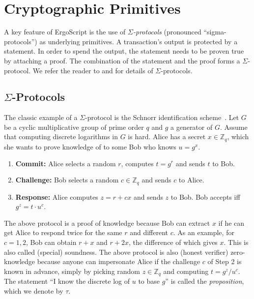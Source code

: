 \documentclass[11pt]{article}
\newcommand{\langname}{ErgoScript\xspace}
\begin{document}
\section{Cryptographic Primitives}
 
A key feature of \langname is the use of \emph{$\Sigma$-protocols} (pronounced ``sigma-protocols'') as underlying primitives. A transaction's output is protected by a statement. In order to spend the output, the statement needs to be proven true by attaching a proof. The combination of the statement and the proof forms a $\Sigma$-protocol. We refer the reader to \cite{Dam10} and \cite[Chapter 6]{HL10} for details of $\Sigma$-protocols. %

\subsection{$\Sigma$-Protocols}
\label{intro:sigma}

The classic example of a $\Sigma$-protocol is the Schnorr identification scheme~\cite{Sch91}. Let $G$ be a cyclic multiplicative group of prime order $q$ and $g$ a generator of $G$. Assume that computing discrete logarithms in $G$ is hard. Alice has a secret $x \in \mathbb{Z}_q$, which she wants to prove knowledge of to some Bob who knows $u = g^x$.

\begin{enumerate}
	\item \textbf{Commit:} Alice selects a random $r$, computes $t = g^r$ and sends $t$ to Bob.
	\item \textbf{Challenge:} Bob selects a random $c\in\mathbb{Z}_q$ and sends $c$ to Alice.
	\item \textbf{Response:} Alice computes $z = r + cx$ and sends $z$ to Bob. Bob accepts iff $g^z = t\cdot u^c$.
\end{enumerate}

The above protocol is a proof of knowledge because Bob can extract $x$ if he can get Alice to respond twice for the same $r$ and different $c$. As an example, for $c = 1, 2$, Bob can obtain $r+x$ and $r+2x$, the difference of which gives $x$. This is also called (special) soundness. The above protocol is also (honest verifier) zero-knowledge because anyone can impersonate Alice if the challenge $c$ of Step 2 is known in advance, simply by picking random $z \in\mathbb{Z}_q$ and computing $t = g^z/u^c$. The statement ``I know the discrete log of $u$ to base $g$'' is called the {\em proposition}, which we denote by $\tau$.
\end{document}

